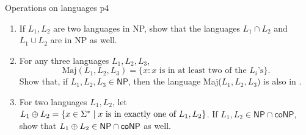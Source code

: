 \documentclass[a4paper, 11pt]{article}
\begin{document}

\begin{problem}{%
		Operations on languages
	}{p4%
	}
\begin{enumerate}[label=(\alph*)]
\item If $L_1,L_2$ are two languages in \textsf{NP}, show that the languages $L_1\cap L_2$ and $L_1\cup L_2$ are in \textsf{NP} as well.
\item For any three languages $L_1,L_2,L_3$, $$\text{Maj}(L_1,L_2,L_3)=\{x\colon x\text{ is in at least two of the $L_i$'s}\}.$$Show that, if $L_1,L_2,L_3\in\textsf{NP}$, then the language Maj($L_1,L_2,L_3$) is also in \sfN\sfP.
\item For two languages $L_1,L_2$, let $L_1\oplus L_2=\{x\in\Sigma^*\mid x\text{ is in exactly one of $L_1,L_2$}\}$. If $L_1,L_2\in \textsf{NP}\cap\textsf{coNP}$, show that $L_1\oplus L_2\in\textsf{NP}\cap \textsf{coNP}$ as well.
\end{enumerate}
\end{problem}
\end{document}

